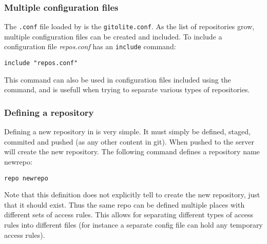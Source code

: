 \subsubsection{Multiple configuration files}
The \texttt{.conf} file loaded by \gitolite{} is the \texttt{gitolite.conf}.
As the list of repositories grow, multiple configuration files can be created and included.
To include a configuration file \textit{repos.conf} \gitolite{} has an \texttt{include} command:
\begin{center}
\texttt{include "repos.conf"}
\end{center}
This command can also be used in configuration files included using the command, and is usefull when trying to separate various types of repositories.

\subsubsection{Defining a repository}
Defining a new repository in \gitolite{} is very simple.
It must simply be defined, staged, commited and pushed (as any other content in git).
When pushed to the server \gitolite{} will create the new repository.
The following command defines a repository name newrepo:
\begin{center}
\texttt{repo newrepo}
\end{center}
Note that this definition does not explicitly tell \gitolite{} to create the new repository, just that it should exist.
Thus the same repo can be defined multiple places with different sets of access rules.
This allows for separating different types of access rules into different files (for instance a separate config file can hold any temporary access rules).

